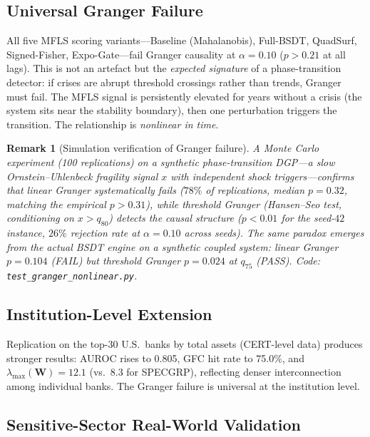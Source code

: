 \documentclass[final]{siamltex}
\newcommand{\lmax}{\lambda_{\max}}
\newtheorem{remark}[theorem]{Remark}
\begin{document}
\subsection{Universal Granger Failure}\label{sec:granger}

All five MFLS scoring variants---Baseline (Mahalanobis),
Full-BSDT, QuadSurf, Signed-Fisher, Expo-Gate---fail Granger causality
at $\alpha=0.10$ ($p>0.21$ at all lags). This is not an artefact
but the \emph{expected signature} of a phase-transition detector:
if crises are abrupt threshold crossings rather than trends,
Granger must fail. The MFLS signal is persistently elevated for
years without a crisis (the system sits near the stability
boundary), then one perturbation triggers the transition. The
relationship is \emph{nonlinear in time}.

\begin{remark}[Simulation verification of Granger failure]
\label{rem:granger_sim}
A Monte Carlo experiment (100 replications) on a synthetic
phase-transition DGP---a slow Ornstein--Uhlenbeck fragility signal
$x$ with independent shock triggers---confirms that linear Granger
\emph{systematically} fails ($78\%$ of replications, median
$p = 0.32$, matching the empirical $p>0.31$), while threshold
Granger (Hansen--Seo test, conditioning on $x > q_{80}$) detects
the causal structure ($p < 0.01$ for the seed-$42$ instance,
$26\%$ rejection rate at $\alpha = 0.10$ across seeds).  The same
paradox emerges from the actual BSDT engine on a synthetic coupled
system: linear Granger $p = 0.104$ (FAIL) but threshold Granger
$p = 0.024$ at $q_{75}$ (PASS).  Code:
\texttt{test\_granger\_nonlinear.py}.
\end{remark}

\subsection{Institution-Level Extension}

Replication on the top-30 U.S.\ banks by total assets (CERT-level
data) produces stronger results: AUROC rises to 0.805, GFC hit
rate to 75.0\%, and $\lmax(\mathbf{W})=12.1$ (vs.\ 8.3 for
SPECGRP), reflecting denser interconnection among individual banks.
The Granger failure is universal at the institution level.

\subsection{Sensitive-Sector Real-World Validation}\label{sec:realworld}
\end{document}
